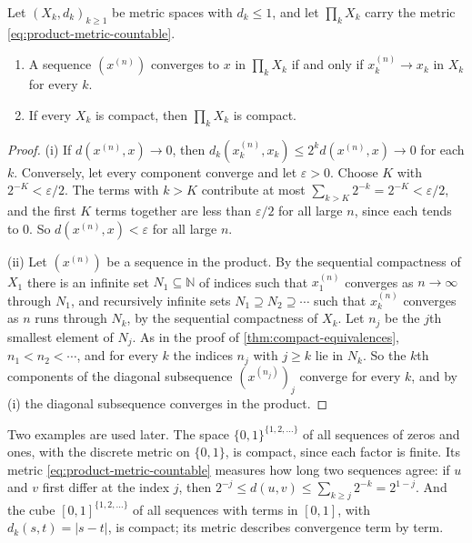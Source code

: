 \begin{theorem}
\label{thm:countable-product}
Let $(X_k,d_k)_{k\ge1}$ be metric spaces with $d_k\le1$, and let $\prod_kX_k$ carry the metric \eqref{eq:product-metric-countable}.
\begin{enumerate}
\item A sequence $(x^{(n)})$ converges to $x$ in $\prod_kX_k$ if and only if $x^{(n)}_k\to x_k$ in $X_k$ for every $k$.
\item If every $X_k$ is compact, then $\prod_kX_k$ is compact.
\end{enumerate}
\end{theorem}

\begin{proof}
(i) If $d(x^{(n)},x)\to0$, then $d_k(x^{(n)}_k,x_k)\le2^kd(x^{(n)},x)\to0$ for each $k$. Conversely, let every component converge and let $\varepsilon>0$. Choose $K$ with $2^{-K}<\varepsilon/2$. The terms with $k>K$ contribute at most $\sum_{k>K}2^{-k}=2^{-K}<\varepsilon/2$, and the first $K$ terms together are less than $\varepsilon/2$ for all large $n$, since each tends to $0$. So $d(x^{(n)},x)<\varepsilon$ for all large $n$.

(ii) Let $(x^{(n)})$ be a sequence in the product. By the sequential compactness of $X_1$ there is an infinite set $N_1\subseteq\mathbb N$ of indices such that $x^{(n)}_1$ converges as $n\to\infty$ through $N_1$, and recursively infinite sets $N_1\supseteq N_2\supseteq\cdots$ such that $x^{(n)}_k$ converges as $n$ runs through $N_k$, by the sequential compactness of $X_k$. Let $n_j$ be the $j$th smallest element of $N_j$. As in the proof of \cref{thm:compact-equivalences}, $n_1<n_2<\cdots$, and for every $k$ the indices $n_j$ with $j\ge k$ lie in $N_k$. So the $k$th components of the diagonal subsequence $(x^{(n_j)})_j$ converge for every $k$, and by (i) the diagonal subsequence converges in the product.
\end{proof}

Two examples are used later. The space $\{0,1\}^{\{1,2,\ldots\}}$ of all sequences of zeros and ones, with the discrete metric on $\{0,1\}$, is compact, since each factor is finite. Its metric \eqref{eq:product-metric-countable} measures how long two sequences agree: if $u$ and $v$ first differ at the index $j$, then $2^{-j}\le d(u,v)\le\sum_{k\ge j}2^{-k}=2^{1-j}$. And the cube $[0,1]^{\{1,2,\ldots\}}$ of all sequences with terms in $[0,1]$, with $d_k(s,t)=|s-t|$, is compact; its metric describes convergence term by term.

